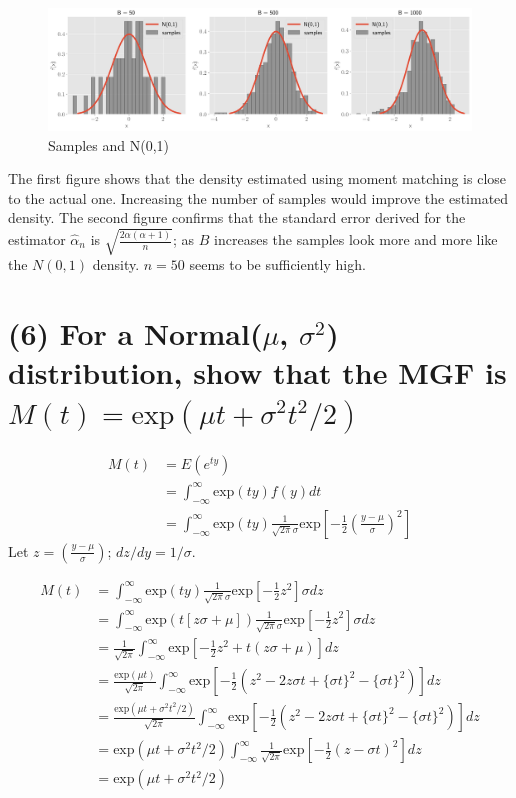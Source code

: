 \documentclass[11pt]{article}
\begin{document}
\begin{figure}[!h]
    \centering
    \includegraphics[scale=.35]{homework_1/second_hist.png}
    \caption{Samples and N(0,1)}
    \label{fig:my_label}
\end{figure}
\newpage
The first figure shows that the density estimated using moment matching is close to the actual one. Increasing the number of samples would improve the estimated density. The second figure confirms that the standard error derived for the estimator $\hat{\alpha}_n$ is $\sqrt{\frac{2\alpha(\alpha+1)}{n}}$; as $B$ increases the samples look more and more like the $N(0,1)$ density. $n = 50$ seems to be sufficiently high.

\section*{(6) For a Normal($\mu$, $\sigma^2$)
distribution, show that the MGF is $M(t) =\text{exp}(\mu t + \sigma^2t^2/2)$}


\begin{align*}
    M(t) &= E(e^{ty})\\
     &=\int_{-\infty}^{\infty} \text{exp}(ty)f(y)dt\\
     &= \int_{-\infty}^{\infty} \text{exp}(ty) \frac{1}{\sqrt{2\pi}\sigma}\text{exp}\left[ -\frac{1}{2}\left(\frac{y-\mu}{\sigma} \right )^2\right]
\end{align*}
Let $z = \left(\frac{y-\mu}{\sigma} \right )$; $dz/dy = 1/\sigma$.

\begin{align*}
    M(t) &= \int_{-\infty}^{\infty} \text{exp}(ty) \frac{1}{\sqrt{2\pi}\sigma}\text{exp}\left[ -\frac{1}{2}z^2\right]\sigma dz\\
    &= \int_{-\infty}^{\infty} \text{exp}(t[z\sigma+\mu]) \frac{1}{\sqrt{2\pi}\sigma}\text{exp}\left[ -\frac{1}{2}z^2\right]\sigma dz\\
    &=  \frac{1}{\sqrt{2\pi}} \int_{-\infty}^{\infty}  \text{exp}\left[ -\frac{1}{2}z^2+t(z\sigma+\mu)\right] dz\\
     &=  \frac{\text{exp}(\mu t)}{\sqrt{2\pi}} \int_{-\infty}^{\infty}  \text{exp}\left[ -\frac{1}{2}(z^2-2z\sigma t + \{\sigma t\}^2 - \{\sigma t\}^2 )\right] dz\\
         &=  \frac{\text{exp}(\mu t + \sigma^2t^2/2)}{\sqrt{2\pi}} \int_{-\infty}^{\infty}  \text{exp}\left[ -\frac{1}{2}(z^2-2z\sigma t + \{\sigma t\}^2 - \{\sigma t\}^2 )\right] dz\\
          &=  \text{exp}(\mu t + \sigma^2t^2/2) \int_{-\infty}^{\infty}  \frac{1}{\sqrt{2 \pi }} \text{exp}\left[ -\frac{1}{2}(z- \sigma t )^2\right] dz\\
           &=  \text{exp}(\mu t + \sigma^2t^2/2)
\end{align*}
\end{document}
